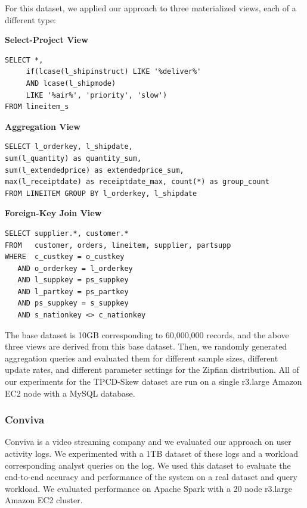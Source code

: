 For this dataset, we applied our approach to three materialized views, each of a different type:
\vspace{1em}

\textbf{Select-Project View}
\begin{lstlisting}
SELECT *, 
     if(lcase(l_shipinstruct) LIKE '%deliver%' 
     AND lcase(l_shipmode) 
     LIKE '%air%', 'priority', 'slow') 
FROM lineitem_s
\end{lstlisting}

\vspace{1em}

\textbf{Aggregation View}
\begin{lstlisting}
SELECT l_orderkey, l_shipdate, 
sum(l_quantity) as quantity_sum, 
sum(l_extendedprice) as extendedprice_sum, 
max(l_receiptdate) as receiptdate_max, count(*) as group_count 
FROM LINEITEM GROUP BY l_orderkey, l_shipdate
\end{lstlisting}

\vspace{1em}

\textbf{Foreign-Key Join View}
\begin{lstlisting}
SELECT supplier.*, customer.* 
FROM   customer, orders, lineitem, supplier, partsupp 
WHERE  c_custkey = o_custkey 
   AND o_orderkey = l_orderkey 
   AND l_suppkey = ps_suppkey 
   AND l_partkey = ps_partkey 
   AND ps_suppkey = s_suppkey 
   AND s_nationkey <> c_nationkey
\end{lstlisting}

\vspace{1em}

The base dataset is 10GB corresponding to 60,000,000 records, and the above three views are derived from this base dataset.
Then, we randomly generated aggregation queries and evaluated them for different sample sizes, different update rates, and different parameter settings for the Zipfian distribution.
All of our experiments for the TPCD-Skew dataset are run on a single r3.large Amazon EC2 node with a MySQL database.

\subsubsection{Conviva}
Conviva is a video streaming company and we evaluated our approach on user activity logs. 
We experimented with a 1TB dataset of these logs and a workload corresponding analyst queries on the log.
We used this dataset to evaluate the end-to-end accuracy and performance of the system on a real dataset and query workload.
We evaluated performance on Apache Spark with a 20 node r3.large Amazon EC2 cluster. 

